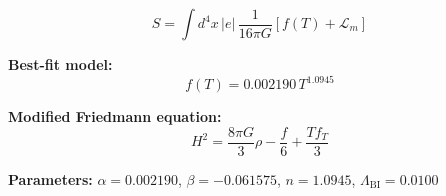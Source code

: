 
\begin{equation}
  S = \int d^4x \, |e| \, \frac{1}{16\pi G} \left[ f(T) + \mathcal{L}_m \right]
\end{equation}

\textbf{Best-fit model:}
\begin{equation}
  f(T) = 0.002190 \, T^{1.0945}
\end{equation}

\textbf{Modified Friedmann equation:}
\begin{equation}
  H^2 = \frac{8\pi G}{3} \rho - \frac{f}{6} + \frac{T f_T}{3}
\end{equation}

\textbf{Parameters:}
$\alpha = 0.002190$, \quad
$\beta = -0.061575$, \quad
$n = 1.0945$, \quad
$\Lambda_{\text{BI}} = 0.0100$